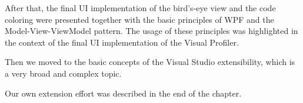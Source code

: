 After that, the final UI implementation of the bird's-eye view and the code coloring were presented together with the basic principles of WPF and the Model-View-ViewModel pattern. The usage of these principles was highlighted in the context of the final UI implementation of the Visual Profiler.

Then we moved to the basic concepts of the Visual Studio extensibility, which is a very broad and complex topic.

Our own extension effort was described in the end of the chapter.












